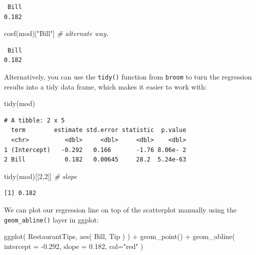 \documentclass[
  letterpaper,
  DIV=11,
  numbers=noendperiod]{scrreprt}
\newenvironment{Shaded}{\begin{snugshade}}{\end{snugshade}}
\newcommand{\AttributeTok}[1]{\textcolor[rgb]{0.49,0.56,0.16}{#1}}
\newcommand{\CommentTok}[1]{\textcolor[rgb]{0.38,0.63,0.69}{\textit{#1}}}
\newcommand{\DecValTok}[1]{\textcolor[rgb]{0.25,0.63,0.44}{#1}}
\newcommand{\FloatTok}[1]{\textcolor[rgb]{0.25,0.63,0.44}{#1}}
\newcommand{\FunctionTok}[1]{\textcolor[rgb]{0.02,0.16,0.49}{#1}}
\newcommand{\NormalTok}[1]{\textcolor[rgb]{0.00,0.44,0.13}{#1}}
\newcommand{\SpecialCharTok}[1]{\textcolor[rgb]{0.25,0.44,0.63}{#1}}
\newcommand{\StringTok}[1]{\textcolor[rgb]{0.25,0.44,0.63}{#1}}
\begin{document}
\begin{verbatim}
 Bill 
0.182 
\end{verbatim}

\begin{Shaded}
\begin{Highlighting}[]
\FunctionTok{coef}\NormalTok{(mod)[}\StringTok{"Bill"}\NormalTok{] }\CommentTok{\# alternate way.}
\end{Highlighting}
\end{Shaded}

\begin{verbatim}
 Bill 
0.182 
\end{verbatim}

Alternatively, you can use the \texttt{tidy()} function from
\texttt{broom} to turn the regression results into a tidy data frame,
which makes it easier to work with:

\begin{Shaded}
\begin{Highlighting}[]
\FunctionTok{tidy}\NormalTok{(mod)}
\end{Highlighting}
\end{Shaded}

\begin{verbatim}
# A tibble: 2 x 5
  term        estimate std.error statistic  p.value
  <chr>          <dbl>     <dbl>     <dbl>    <dbl>
1 (Intercept)   -0.292   0.166       -1.76 8.06e- 2
2 Bill           0.182   0.00645     28.2  5.24e-63
\end{verbatim}

\begin{Shaded}
\begin{Highlighting}[]
\FunctionTok{tidy}\NormalTok{(mod)[[}\DecValTok{2}\NormalTok{,}\DecValTok{2}\NormalTok{]] }\CommentTok{\# slope}
\end{Highlighting}
\end{Shaded}

\begin{verbatim}
[1] 0.182
\end{verbatim}

We can plot our regression line on top of the scatterplot manually using
the \texttt{geom\_abline()} layer in ggplot:

\begin{Shaded}
\begin{Highlighting}[]
\FunctionTok{ggplot}\NormalTok{( RestaurantTips, }\FunctionTok{aes}\NormalTok{( Bill, Tip ) ) }\SpecialCharTok{+}
  \FunctionTok{geom\_point}\NormalTok{() }\SpecialCharTok{+}
  \FunctionTok{geom\_abline}\NormalTok{( }\AttributeTok{intercept =} \SpecialCharTok{{-}}\FloatTok{0.292}\NormalTok{, }\AttributeTok{slope =}  \FloatTok{0.182}\NormalTok{, }\AttributeTok{col=}\StringTok{"red"}\NormalTok{ )}
\end{Highlighting}
\end{Shaded}
\end{document}
